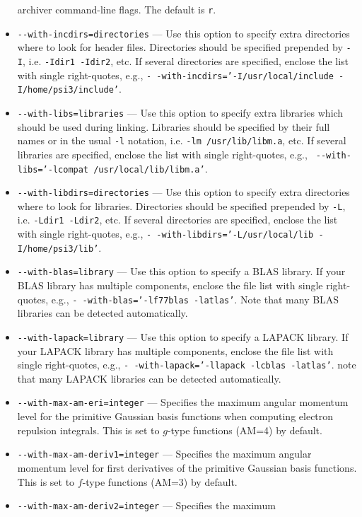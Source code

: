 \documentclass[12pt]{article}
\begin{document}
\begin{itemize}
  archiver command-line flags. The default is {\tt r}.
\item {\tt -}{\tt -with-incdirs=directories} --- Use this option to
  specify extra directories where to look for header
  files. Directories should be specified prepended by {\tt -I},
  i.e. {\tt -Idir1 -Idir2}, etc. If several directories are specified,
  enclose the list with single right-quotes, e.g., {\tt -}{\tt
    -with-incdirs='-I/usr/local/include -I/home/psi3/include'}.
\item {\tt -}{\tt -with-libs=libraries} --- Use this option to specify
  extra libraries which should be used during linking. Libraries
  should be specified by their full names or in the usual {\tt -l}
  notation, i.e. {\tt -lm /usr/lib/libm.a}, etc.  If several libraries
  are specified, enclose the list with single right-quotes, e.g., {\tt
    -}{\tt -with-libs='-lcompat /usr/local/lib/libm.a'}.
\item {\tt -}{\tt -with-libdirs=directories} --- Use this option to
  specify extra directories where to look for libraries. Directories
  should be specified prepended by {\tt -L}, i.e. {\tt -Ldir1 -Ldir2},
  etc. If several directories are specified, enclose the list with
  single right-quotes, e.g., {\tt -}{\tt
    -with-libdirs='-L/usr/local/lib -I/home/psi3/lib'}.
\item {\tt -}{\tt -with-blas=library} --- Use this option to specify a
  BLAS library.  If your BLAS library has multiple components, enclose
  the file list with single right-quotes, e.g., {\tt -}{\tt
    -with-blas='-lf77blas -latlas'}.  Note that many BLAS libraries
  can be detected automatically.
\item {\tt -}{\tt -with-lapack=library} --- Use this option to specify
  a LAPACK library.  If your LAPACK library has multiple components,
  enclose the file list with single right-quotes, e.g., {\tt -}{\tt
    -with-lapack='-llapack -lcblas -latlas'}.  note that many LAPACK
  libraries can be detected automatically.
\item {\tt -}{\tt -with-max-am-eri=integer} --- Specifies the maximum
  angular momentum level for the primitive Gaussian basis functions
  when computing electron repulsion integrals.  This is set to
  $g$-type functions (AM=4) by default.
\item {\tt -}{\tt -with-max-am-deriv1=integer} --- Specifies the maximum
  angular momentum level for first derivatives of the primitive
  Gaussian basis functions.  This is set to $f$-type functions (AM=3)
  by default.
\item {\tt -}{\tt -with-max-am-deriv2=integer} --- Specifies the maximum

\end{itemize}
\end{document}
